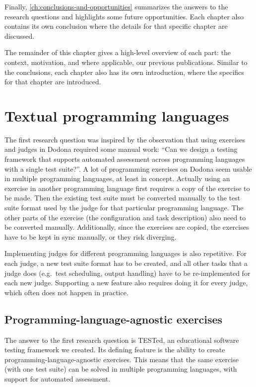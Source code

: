 \documentclass[../main]{subfiles}
\begin{document}
Finally, \cref{ch:conclusions-and-opportunities} summarizes the answers to the research questions and highlights some future opportunities.
Each chapter also contains its own conclusion where the details for that specific chapter are discussed.

The remainder of this chapter gives a high-level overview of each part: the context, motivation, and where applicable, our previous publications.
Similar to the conclusions, each chapter also has its own introduction, where the specifics for that chapter are introduced.

\section{Textual programming languages}\label{sec:intro-tested}

The first research question  was inspired by the observation that using exercises and judges in Dodona required some manual work: ``Can we design a testing framework that supports automated assessment across programming languages with a single test suite?''.
A lot of programming exercises on Dodona seem usable in multiple programming languages, at least in concept.
Actually using an exercise in another programming language first requires a copy of the exercise to be made.
Then the existing test suite must be converted manually to the test suite format used by the judge for that particular programming language.
The other parts of the exercise (the configuration and task description) also need to be converted manually.
Additionally, since the exercises are copied, the exercises have to be kept in sync manually, or they risk diverging.

Implementing judges for different programming languages is also repetitive.
For each judge, a new test suite format has to be created, and all other tasks that a judge does (e.g.\ test scheduling, output handling) have to be re-implemented for each new judge.
Supporting a new feature also requires doing it for every judge, which often does not happen in practice.

\subsection{Programming-language-agnostic exercises}\label{subsec:programming-language-agnostic-testing}

The answer to the first research question  is TESTed, an educational software testing framework we created.
Its defining feature is the ability to create programming-language-agnostic exercises.
This means that the same exercise (with one test suite) can be solved in multiple programming languages, with support for automated assessment.
\end{document}
